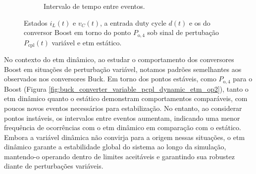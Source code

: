 \begin{figure}[H]
\begin{subfigure}{1.\textwidth}
    \caption{Intervalo de tempo entre eventos.}
    \label{fig:boost_converter_variable_pcpl_static_etm_op2_duty_c}
  \end{subfigure}
  \caption{Estados $i_L(t)$ e $v_C(t)$, a entrada duty cycle $d(t)$ e os  do conversor Boost em torno do ponto $P_{\mathrm{o}, 4}$ sob sinal de pertubação $P_{\mathrm{cpl}}(t)$ variável e \acrshort{etm} estático.}
\end{figure}

No contexto do \acrshort{etm} dinâmico, ao estudar o comportamento dos conversores Boost em situações de perturbação variável, notamos padrões semelhantes aos observados nos conversores Buck. Em torno dos pontos estáveis, como $P_{\mathrm{o}, 4}$ para o Boost (Figura \ref{fig:buck_converter_variable_pcpl_dynamic_etm_op2}), tanto o \acrshort{etm} dinâmico quanto o estático demonstram comportamentos comparáveis, com poucos novos eventos necessários para estabilização. No entanto, ao considerar pontos instáveis, os intervalos entre eventos aumentam, indicando uma menor frequência de ocorrências com o \acrshort{etm} dinâmico em comparação com o estático. Embora a variável dinâmica não convirja para a origem nessas situações, o \acrshort{etm} dinâmico garante a estabilidade global do sistema ao longo da simulação, mantendo-o operando dentro de limites aceitáveis e garantindo sua robustez diante de perturbações variáveis.

